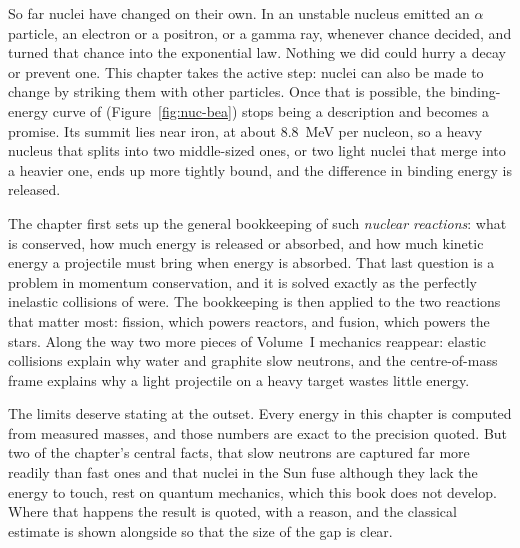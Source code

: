 

So far nuclei have changed on their own. In  an unstable nucleus emitted an $\alpha$
particle, an electron or a positron, or a gamma ray, whenever chance decided, and 
turned that chance into the exponential law. Nothing we did could hurry a decay or prevent one. This
chapter takes the active step: nuclei can also be made to change by striking them with other particles.
Once that is possible, the binding-energy curve of  (Figure~\ref{fig:nuc-bea}) stops being a description and
becomes a promise. Its summit lies near iron, at about \SI{8.8}{\MeV} per nucleon, so a heavy nucleus
that splits into two middle-sized ones, or two light nuclei that merge into a heavier one, ends up more
tightly bound, and the difference in binding energy is released.

The chapter first sets up the general bookkeeping of such \emph{nuclear reactions}: what is conserved,
how much energy is released or absorbed, and how much kinetic energy a projectile must bring when energy
is absorbed. That last question is a problem in momentum conservation, and it is solved exactly as the
perfectly inelastic collisions of  were. The bookkeeping is then applied to the two
reactions that matter most: fission, which powers reactors, and fusion, which powers the stars. Along the
way two more pieces of Volume~I mechanics reappear: elastic collisions explain why water and graphite slow
neutrons, and the centre-of-mass frame explains why a light projectile on a heavy target wastes little
energy.

The limits deserve stating at the outset. Every energy in this chapter is computed from measured masses,
and those numbers are exact to the precision quoted. But two of the chapter's central facts, that slow
neutrons are captured far more readily than fast ones and that nuclei in the Sun fuse although they lack
the energy to touch, rest on quantum mechanics, which this book does not develop. Where that happens the
result is quoted, with a reason, and the classical estimate is shown alongside so that the size of the
gap is clear.

